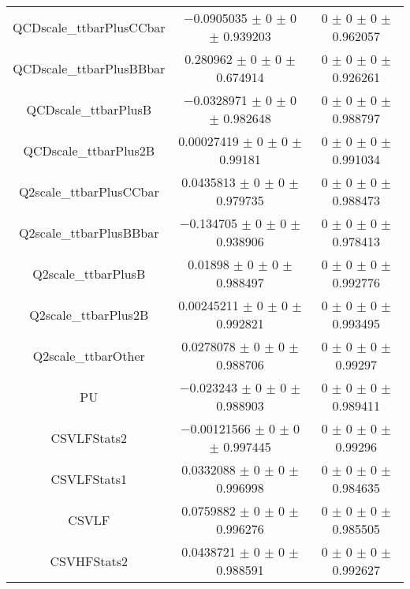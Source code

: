 \begin{table}
\begin{tabular}{ccc}
QCDscale\_ttbarPlusCCbar 	& \num{-0.0905035} $\pm$ \num{0} $\pm$ \num{0} $\pm$ \num{0.939203} 	& \num{0} $\pm$ \num{0} $\pm$ \num{0} $\pm$ \num{0.962057}\\
QCDscale\_ttbarPlusBBbar 	& \num{0.280962} $\pm$ \num{0} $\pm$ \num{0} $\pm$ \num{0.674914} 	& \num{0} $\pm$ \num{0} $\pm$ \num{0} $\pm$ \num{0.926261}\\
QCDscale\_ttbarPlusB 	& \num{-0.0328971} $\pm$ \num{0} $\pm$ \num{0} $\pm$ \num{0.982648} 	& \num{0} $\pm$ \num{0} $\pm$ \num{0} $\pm$ \num{0.988797}\\
QCDscale\_ttbarPlus2B 	& \num{0.00027419} $\pm$ \num{0} $\pm$ \num{0} $\pm$ \num{0.99181} 	& \num{0} $\pm$ \num{0} $\pm$ \num{0} $\pm$ \num{0.991034}\\
Q2scale\_ttbarPlusCCbar 	& \num{0.0435813} $\pm$ \num{0} $\pm$ \num{0} $\pm$ \num{0.979735} 	& \num{0} $\pm$ \num{0} $\pm$ \num{0} $\pm$ \num{0.988473}\\
Q2scale\_ttbarPlusBBbar 	& \num{-0.134705} $\pm$ \num{0} $\pm$ \num{0} $\pm$ \num{0.938906} 	& \num{0} $\pm$ \num{0} $\pm$ \num{0} $\pm$ \num{0.978413}\\
Q2scale\_ttbarPlusB 	& \num{0.01898} $\pm$ \num{0} $\pm$ \num{0} $\pm$ \num{0.988497} 	& \num{0} $\pm$ \num{0} $\pm$ \num{0} $\pm$ \num{0.992776}\\
Q2scale\_ttbarPlus2B 	& \num{0.00245211} $\pm$ \num{0} $\pm$ \num{0} $\pm$ \num{0.992821} 	& \num{0} $\pm$ \num{0} $\pm$ \num{0} $\pm$ \num{0.993495}\\
Q2scale\_ttbarOther 	& \num{0.0278078} $\pm$ \num{0} $\pm$ \num{0} $\pm$ \num{0.988706} 	& \num{0} $\pm$ \num{0} $\pm$ \num{0} $\pm$ \num{0.99297}\\
PU 	& \num{-0.023243} $\pm$ \num{0} $\pm$ \num{0} $\pm$ \num{0.988903} 	& \num{0} $\pm$ \num{0} $\pm$ \num{0} $\pm$ \num{0.989411}\\
CSVLFStats2 	& \num{-0.00121566} $\pm$ \num{0} $\pm$ \num{0} $\pm$ \num{0.997445} 	& \num{0} $\pm$ \num{0} $\pm$ \num{0} $\pm$ \num{0.99296}\\
CSVLFStats1 	& \num{0.0332088} $\pm$ \num{0} $\pm$ \num{0} $\pm$ \num{0.996998} 	& \num{0} $\pm$ \num{0} $\pm$ \num{0} $\pm$ \num{0.984635}\\
CSVLF 	& \num{0.0759882} $\pm$ \num{0} $\pm$ \num{0} $\pm$ \num{0.996276} 	& \num{0} $\pm$ \num{0} $\pm$ \num{0} $\pm$ \num{0.985505}\\
CSVHFStats2 	& \num{0.0438721} $\pm$ \num{0} $\pm$ \num{0} $\pm$ \num{0.988591} 	& \num{0} $\pm$ \num{0} $\pm$ \num{0} $\pm$ \num{0.992627}\\

\end{tabular}
\end{table}
